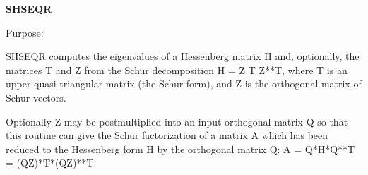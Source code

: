 {\bfseries S\+H\+S\+E\+Q\+R} 

 \begin{DoxyParagraph}{Purpose\+: }
\begin{DoxyVerb}    SHSEQR computes the eigenvalues of a Hessenberg matrix H
    and, optionally, the matrices T and Z from the Schur decomposition
    H = Z T Z**T, where T is an upper quasi-triangular matrix (the
    Schur form), and Z is the orthogonal matrix of Schur vectors.

    Optionally Z may be postmultiplied into an input orthogonal
    matrix Q so that this routine can give the Schur factorization
    of a matrix A which has been reduced to the Hessenberg form H
    by the orthogonal matrix Q:  A = Q*H*Q**T = (QZ)*T*(QZ)**T.\end{DoxyVerb}
 
\end{DoxyParagraph}

